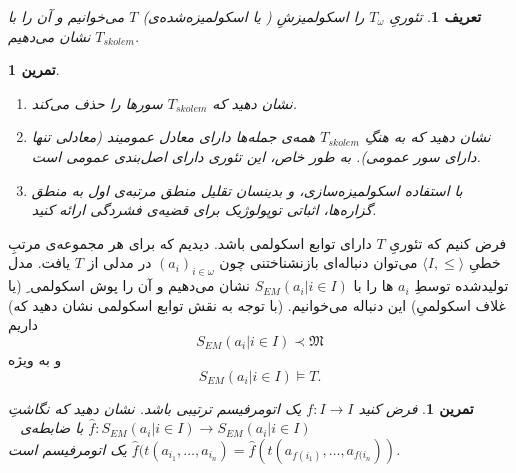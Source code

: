 \documentclass[12pt,a4paper]{report}
\theoremstyle{colorhead}
\newtheorem{tam}[thm]{تمرین}
\newtheorem{defn}[thm]{تعریف}
\begin{document}
\begin{defn}
تئوریِ
$T_\omega$
را
اسکولمیزشِ ( یا اسکولمیزه‌شده‌ی)
$T$
می‌خوانیم و آن را با
$T_{skolem}$
نشان می‌دهیم.
\end{defn}
\begin{tam}
\hfill
\begin{enumerate}
\item 
نشان دهید که 
$T_{skolem}$
سورها را حذف می‌کند.
\item
نشان دهید که به هنگِ
$T_{skolem}$
همه‌ی جمله‌ها دارای معادل عمومیند (معادلی تنها دارای سور عمومی). به طور خاص، این تئوری دارای 
 اصل‌بندی عمومی است.
\item 
با استفاده اسکولمیزه‌سازی، و بدینسان تقلیل منطق مرتبه‌ی اول به منطق گزاره‌ها، اثباتی توپولوژیک برای قضیه‌ی فشردگی ارائه کنید.
\end{enumerate}
\end{tam}
فرض کنیم که تئوریِ
$T$
دارای توابع اسکولمی باشد. دیدیم که برای هر مجموعه‌ی مرتبِ خطیِ
$\langle I,\leq\rangle$
می‌توان دنباله‌ای بازنشناختنی چون
$(a_i)_{i\in \omega}$
در مدلی از
$T$
یافت. مدل تولیدشده‌ توسطِ
$a_i$
ها را با 
$S_{EM}(a_i|i\in I)$
نشان می‌دهیم و آن را پوش اسکولمی ِ
(یا غلاف اسکولمیِ)
این دنباله می‌خوانیم. (با توجه به نقش توابع اسکولمی نشان دهید که) داریم
\[
S_{EM}(a_i|i\in I)\prec \mathfrak{M}
\]
و به ويژه
\[
S_{EM}(a_i|i\in I)\models T.
\]
\begin{tam}
فرض کنید
$f:I\to I$
یک اتومرفیسم ترتیبی باشد. نشان دهید که نگاشتِ
$\hat{f}:S_{EM}(a_i|i\in I)\to S_{EM}(a_i|i\in I)$
با ضابطه‌ی
\mbox{
$\hat{f}(t(a_{i_1},\ldots,a_{i_n})=
\hat{f}(t(a_{f(i_1)},\ldots,a_{f(i_n}))$}
یک اتومرفیسم است. 

\end{tam}
\end{document}
